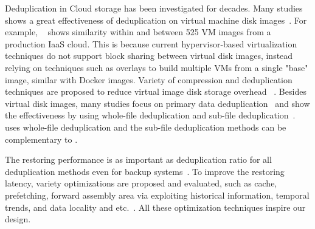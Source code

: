%
%
%

Deduplication in Cloud storage has been investigated for decades.
Many studies
shows
a great effectiveness of deduplication on virtual machine disk images~\cite{}.
For example,
~\cite{empirical analysisvm}
shows
similarity within and between 525 VM images from a production IaaS cloud.
This is because current hypervisor-based virtualization techniques
do not support block sharing between virtual disk images, 
instead relying on techniques such as overlays 
to build multiple VMs from a single "base" image, similar with Docker images.
Variety of compression and deduplication
techniques are proposed to reduce virtual image disk storage overhead
~\cite{xxx}.
Besides virtual disk images,
many studies focus on primary data deduplication~\cite{xxx}
and show the effectiveness by using
whole-file deduplication and 
sub-file deduplication~\cite{xxx}.
\sysname uses whole-file deduplication and
the sub-file deduplication methods
can be complementary to \sysname.

The restoring performance is 
as important as deduplication ratio for all deduplication methods even for backup systems~\cite{xxx}.
To improve the restoring latency,
variety optimizations are proposed and evaluated, such as  
cache, prefetching, forward assembly area via exploiting historical information, 
temporal trends, and data locality
and etc.~\cite{xxx}.
All these optimization techniques inspire our \sysname design.

